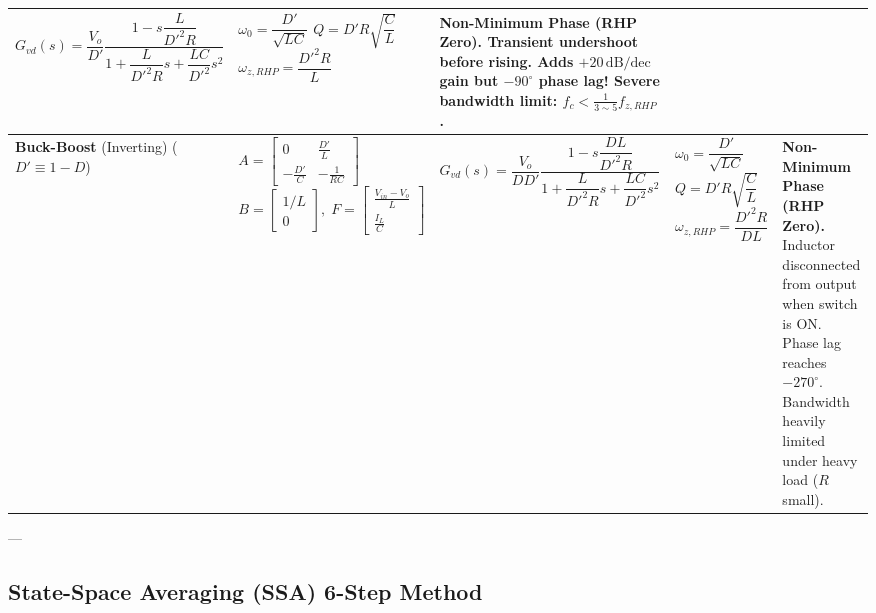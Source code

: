 \begin{center}
\begin{tabularx}{\textwidth}{@{} >{\raggedright\arraybackslash}p{2.0cm} >{\raggedright\arraybackslash}p{2.6cm} >{\raggedright\arraybackslash}p{4.8cm} >{\raggedright\arraybackslash}p{2.6cm} >{\raggedright\arraybackslash}X @{}}
$G_{vd}(s) = \dfrac{V_o}{D'} \dfrac{1 - s \dfrac{L}{{D'}^2 R}}{1 + \dfrac{L}{{D'}^2 R} s + \dfrac{LC}{{D'}^2} s^2}$ &
$\omega_0 = \dfrac{D'}{\sqrt{LC}}$ \newline
$Q = D' R \sqrt{\dfrac{C}{L}}$ \newline
$\omega_{z,RHP} = \dfrac{{D'}^2 R}{L}$ &
\textbf{Non-Minimum Phase (RHP Zero).} Transient undershoot before rising. Adds $+20\,\text{dB/dec}$ gain but $-90^\circ$ phase lag! Severe bandwidth limit: $f_c < \frac{1}{3 \sim 5} f_{z,RHP}$. \\
\midrule
\textbf{Buck-Boost} \newline (Inverting) \newline ($D' \equiv 1-D$) &
$A = \begin{bmatrix} 0 & \frac{D'}{L} \\ -\frac{D'}{C} & -\frac{1}{RC} \end{bmatrix}$ \newline
$B = \begin{bmatrix} 1/L \\ 0 \end{bmatrix}, \; F = \begin{bmatrix} \frac{V_{in} - V_o}{L} \\ \frac{I_L}{C} \end{bmatrix}$ &
$G_{vd}(s) = \dfrac{V_o}{D D'} \dfrac{1 - s \dfrac{D L}{{D'}^2 R}}{1 + \dfrac{L}{{D'}^2 R} s + \dfrac{LC}{{D'}^2} s^2}$ &
$\omega_0 = \dfrac{D'}{\sqrt{LC}}$ \newline
$Q = D' R \sqrt{\dfrac{C}{L}}$ \newline
$\omega_{z,RHP} = \dfrac{{D'}^2 R}{D L}$ &
\textbf{Non-Minimum Phase (RHP Zero).} Inductor disconnected from output when switch is ON. Phase lag reaches $-270^\circ$. Bandwidth heavily limited under heavy load ($R$ small). \\
\bottomrule
\end{tabularx}
\end{center}

---

\subsection{State-Space Averaging (SSA) 6-Step Method}

